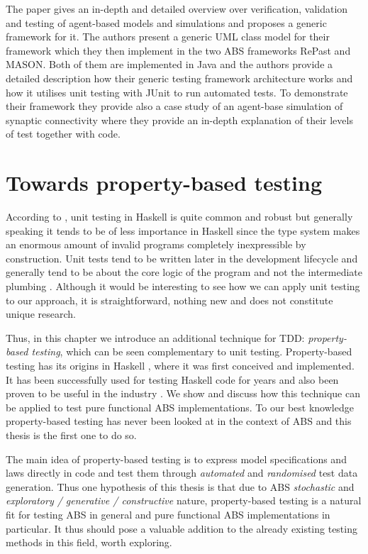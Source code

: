 The paper \cite{gurcan_generic_2013} gives an in-depth and detailed overview over verification, validation and testing of agent-based models and simulations and proposes a generic framework for it. The authors present a generic UML class model for their framework which they then implement in the two ABS frameworks RePast and MASON. Both of them are implemented in Java and the authors provide a detailed description how their generic testing framework architecture works and how it utilises unit testing with JUnit to run automated tests. To demonstrate their framework they provide also a case study of an agent-base simulation of synaptic connectivity where they provide an in-depth explanation of their levels of test together with code.

\section*{Towards property-based testing}
According to \cite{diehl_what_nodate}, unit testing in Haskell is quite common and robust but generally speaking it tends to be of less importance in Haskell since the type system makes an enormous amount of invalid programs completely inexpressible by construction. Unit tests tend to be written later in the development lifecycle and generally tend to be about the core logic of the program and not the intermediate plumbing \cite{diehl_what_nodate}. Although it would be interesting to see how we can apply unit testing to our approach, it is straightforward, nothing new and does not constitute unique research. 

Thus, in this chapter we introduce an additional technique for TDD: \textit{property-based testing}, which can be seen complementary to unit testing. Property-based testing has its origins in Haskell \cite{claessen_quickcheck_2000,claessen_testing_2002,runciman_smallcheck_2008}, where it was first conceived and implemented. It has been successfully used for testing Haskell code for years and also been proven to be useful in the industry \cite{hughes_quickcheck_2007}. We show and discuss how this technique can be applied to test pure functional ABS implementations. To our best knowledge property-based testing has never been looked at in the context of ABS and this thesis is the first one to do so.

\medskip

The main idea of property-based testing is to express model specifications and laws directly in code and test them through \textit{automated} and \textit{randomised} test data generation. Thus one hypothesis of this thesis is that due to ABS \textit{stochastic} and \textit{exploratory / generative / constructive } nature, property-based testing is a natural fit for testing ABS in general and pure functional ABS implementations in particular. It thus should pose a valuable addition to the already existing testing methods in this field, worth exploring.

